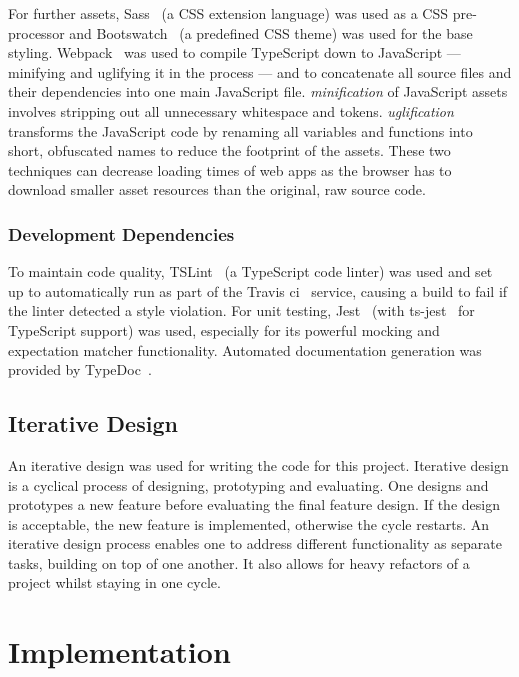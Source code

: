 \documentclass[nobib, a4paper, twoside, justified]{tufte-book}
\begin{document}
For further assets, Sass~\autocite{sass-lang} (a CSS extension language) was used as a CSS
pre-processor and Bootswatch~\autocite{bootswatch-flatly} (a predefined CSS theme) was used for the
base styling.  Webpack~\autocite{webpack} was used to compile TypeScript down to JavaScript ---
minifying and uglifying it in the process --- and to concatenate all source files and their
dependencies into one main JavaScript file. \textit{\Gls{minification}} of JavaScript assets
involves stripping out all unnecessary whitespace and tokens.  \textit{\Gls{uglification}}
transforms the JavaScript code by renaming all variables and functions into short, obfuscated names
to reduce the footprint of the assets. These two techniques can decrease loading times of web apps
as the browser has to download smaller asset resources than the original, raw source code.

\subsection{Development Dependencies}%
\label{sub:development_dependencies}

To maintain code quality, TSLint~\autocite{tslint} (a TypeScript code linter) was used and set up to
automatically run as part of the Travis \gls{ci}~\autocite{travis} service, causing a build to fail
if the linter detected a style violation. For unit testing, Jest~\autocite{jest} (with
ts-jest~\autocite{ts-jest} for TypeScript support) was used, especially for its powerful mocking
and expectation matcher functionality. Automated documentation generation was provided by
TypeDoc~\autocite{typedoc}.

\section{Iterative Design}%
\label{sec:iterative_design}

An iterative design was used for writing the code for this project. Iterative design is a cyclical
process of designing, prototyping and evaluating. One designs and prototypes a new feature before
evaluating the final feature design. If the design is acceptable, the new feature is implemented,
otherwise the cycle restarts. An iterative design process enables one to address different functionality
as separate tasks, building on top of one another. It also allows for heavy refactors of a project
whilst staying in one cycle.

\chapter{Implementation}%
\label{cha:implementation}
\end{document}
